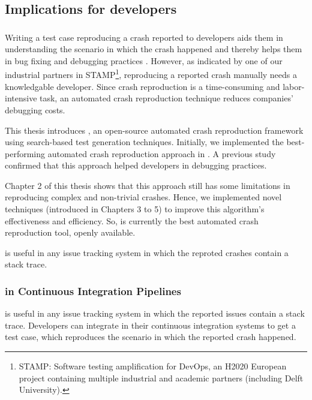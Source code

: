 \subsection{Implications for developers}

\subsubsection{\botsing}

Writing a test case reproducing a crash reported to developers aids them in understanding the scenario in which the crash happened and thereby helps them in bug fixing and debugging practices \cite{Zeller2009}. However, as indicated by one of our industrial partners in STAMP\footnote{STAMP: Software testing amplification for DevOps, an H2020 European project containing multiple industrial and academic partners (including Delft University).}, reproducing a reported crash manually needs a knowledgable developer. Since crash reproduction is a time-consuming and labor-intensive task, an automated crash reproduction technique reduces companies' debugging costs.

This thesis introduces \botsing, an open-source automated crash reproduction framework using search-based test generation techniques. 
Initially, we implemented the best-performing automated crash reproduction approach \cite{Soltani2018a} in \botsing. A previous study confirmed that this approach helped developers in debugging practices.

Chapter 2 of this thesis shows that this approach still has some limitations in reproducing complex and non-trivial crashes. Hence, we implemented novel techniques (introduced in Chapters 3 to 5) to improve this algorithm's effectiveness and efficiency. So, \botsing is currently the best automated crash reproduction tool, openly available.


\botsing is useful in any issue tracking system in which the reproted crashes contain a stack trace.


\subsubsection{\botsing in Continuous Integration Pipelines}
\botsing is useful in any issue tracking system in which the reported issues contain a stack trace. Developers can integrate \botsing in their continuous integration systems to get a test case, which reproduces the scenario in which the reported crash happened.


